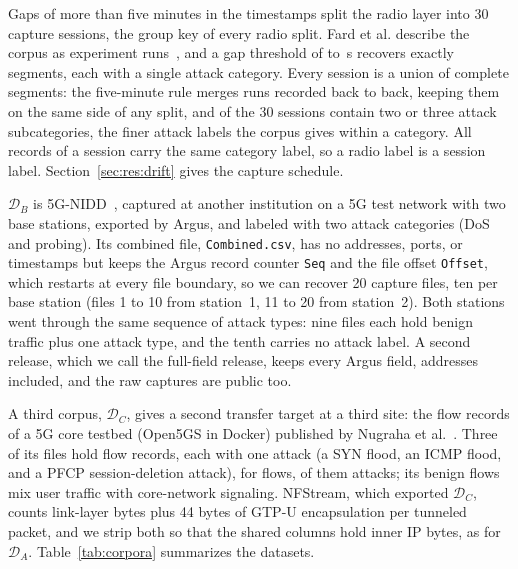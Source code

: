 \documentclass{ieeeaccess}
\newcommand{\DA}{\ensuremath{\mathcal{D}_{A}}}
\newcommand{\DB}{\ensuremath{\mathcal{D}_{B}}}
\newcommand{\DC}{\ensuremath{\mathcal{D}_{C}}}
\begin{document}
Gaps of more than five minutes in the timestamps split the radio layer into 30 capture sessions, the group key of every radio split. Fard et al. describe the corpus as \SessRunN{} experiment runs~\cite{fard2026crosslayer}, and a gap threshold of \SessRunGapMin{} to \SessRunGapMax{}\,s recovers exactly \SessRunN{} segments, each with a single attack category. Every session is a union of complete segments: the five-minute rule merges runs recorded back to back, keeping them on the same side of any split, and \SessMultiSub{} of the 30 sessions contain two or three attack subcategories, the finer attack labels the corpus gives within a category. All records of a session carry the same category label, so a radio label is a session label. Section~\ref{sec:res:drift} gives the capture schedule.

\DB{} is 5G-NIDD~\cite{samarakoon2022nidd,siriwardhana2025descriptor}, captured at another institution on a 5G test network with two base stations, exported by Argus, and labeled with two attack categories (DoS and probing). Its combined file, \texttt{Combined.csv}, has no addresses, ports, or timestamps but keeps the Argus record counter \texttt{Seq} and the file offset \texttt{Offset}, which restarts at every file boundary, so we can recover 20 capture files, ten per base station (files 1 to 10 from station~1, 11 to 20 from station~2). Both stations went through the same sequence of attack types: nine files each hold benign traffic plus one attack type, and the tenth carries no attack label. A second release, which we call the full-field release, keeps every Argus field, addresses included, and the raw captures are public too.

A third corpus, \DC{}, gives a second transfer target at a third site: the flow records of a 5G core testbed (Open5GS in Docker) published by Nugraha et al.~\cite{nugraha2025fivegdatasets}. Three of its files hold flow records, each with one attack (a SYN flood, an ICMP flood, and a PFCP session-deletion attack), for \ThNflows{} flows, \ThNattack{} of them attacks; its benign flows mix user traffic with core-network signaling. NFStream, which exported \DC{}, counts link-layer bytes plus 44 bytes of GTP-U encapsulation per tunneled packet, and we strip both so that the shared columns hold inner IP bytes, as for \DA{}. Table~\ref{tab:corpora} summarizes the datasets.

\begin{table}[t]
\caption{Datasets. \DA{} supplies training and in-distribution testing on both layers. \DB{} and \DC{} are transfer targets, and the in-target references of each are trained and tested on it. \DB{} is also the training source for the reverse direction and for transfer to \DC{}.}
\label{tab:corpora}
\centering
\footnotesize
\setlength{\tabcolsep}{3pt}

\end{table}
\end{document}
